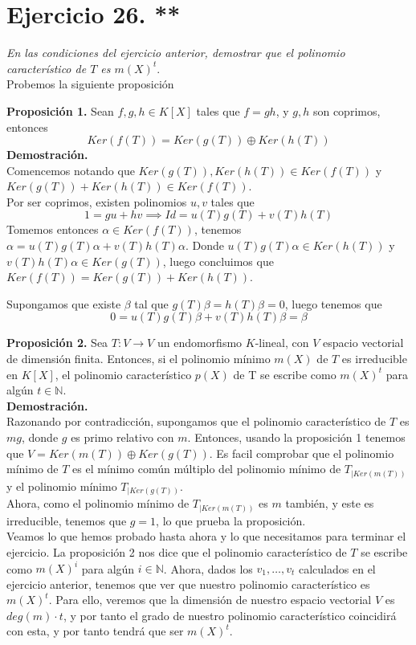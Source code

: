 \section{Ejercicio 26. **} \textit{En las condiciones del ejercicio anterior,
  demostrar que el polinomio característico de \(T\) es \(m(X)^t\)}.\\

Probemos la siguiente proposición

\textbf{Proposición 1. }Sean \(f,g,h \in K[X]\) tales que \(f = gh\), y \(g,h\) son
coprimos, entonces
\[
  Ker(f(T)) = Ker(g(T)) \oplus Ker(h(T))
\]
\textbf{Demostración.}\\
Comencemos notando que \(Ker(g(T)), Ker(h(T)) \in Ker(f(T))\) y \(Ker(g(T)) +
Ker(h(T)) \in Ker(f(T))\).\\ Por ser coprimos, existen polinomios \(u,v\) tales
que
\[
  1 = gu + hv \implies Id = u(T)g(T) + v(T)h(T)
\]
Tomemos entonces \(\alpha \in Ker(f(T))\), tenemos \(\alpha = u(T)g(T)\alpha +
v(T)h(T)\alpha\).
Donde  \( u(T)g(T)\alpha \in Ker(h(T))\) y  \( v(T)h(T)\alpha \in Ker(g(T))\),
luego concluimos que \(Ker(f(T)) = Ker(g(T)) + Ker(h(T))\).

Supongamos que existe \(\beta\) tal que \(g(T)\beta = h(T)\beta = 0\), luego
tenemos que
\[
  0 = u(T)g(T)\beta + v(T)h(T)\beta = \beta
\]

\textbf{Proposición 2.} Sea \(T: V \rightarrow V \) un endomorfismo \(K\)-lineal, con \(V\) espacio vectorial de dimensión finita. Entonces, si el polinomio mínimo \(m(X)\) de  \(T\) es irreducible en  \(K[X]\), el polinomio característico \(p(X)\) de T se escribe como \(m(X)^t\) para algún \(t \in \mathbb{N}\).\\

\textbf{Demostración.}\\
Razonando por contradicción, supongamos que el polinomio característico de \(T\) es  \(mg\), donde  \(g\) es primo relativo con \(m\). Entonces, usando la proposición 1 tenemos que \(V = Ker(m(T)) \oplus Ker(g(T))\). Es facil comprobar que el polinomio mínimo de \(T\) es el mínimo común múltiplo del polinomio mínimo de \(T_{|Ker(m(T))}\) y el polinomio mínimo \(T_{|Ker(g(T))}\).\\

Ahora, como el polinomio mínimo de \(T_{|Ker(m(T))}\) es \(m\) también, y este es irreducible, tenemos que \(g = 1\), lo que prueba la proposición.\\

Veamos lo que hemos probado hasta ahora y lo que necesitamos para terminar el ejercicio. La proposición 2 nos dice que el polinomio característico de \(T\) se escribe como \(m(X)^i\) para algún \(i \in \mathbb{N}\). Ahora, dados los \(v_1, \dots, v_t\) calculados en el ejercicio anterior, tenemos que ver que nuestro polinomio característico es \(m(X)^t\). Para ello, veremos que la dimensión de nuestro espacio vectorial \(V\) es  \(deg(m) \cdot t\), y por tanto el grado de nuestro polinomio característico coincidirá con esta, y por tanto tendrá que ser \(m(X)^t\).\\


